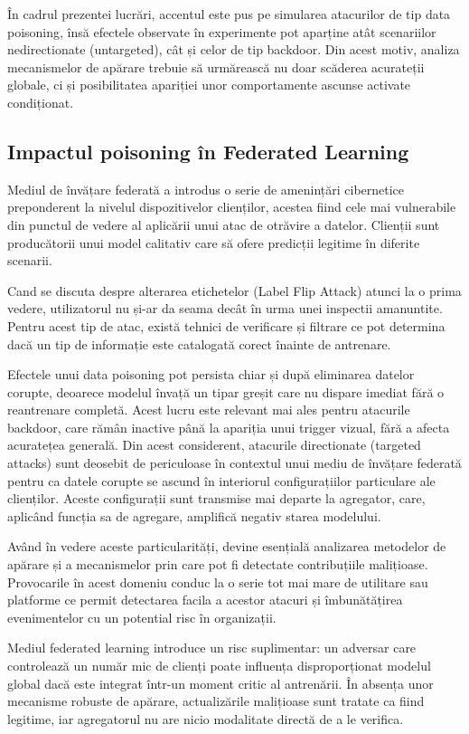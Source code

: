 \documentclass[../../main.tex]{subfiles}
\begin{document}
    În cadrul prezentei lucrări, accentul este pus pe simularea atacurilor de tip data poisoning, însă efectele observate în experimente pot aparține atât scenariilor nedirectionate (untargeted), cât și celor de tip backdoor. Din acest motiv, analiza mecanismelor de apărare trebuie să urmărească nu doar scăderea acurateții globale, ci și posibilitatea apariției unor comportamente ascunse activate condiționat.

    \subsection{Impactul poisoning în Federated Learning}


Mediul de învățare federată a introdus o serie de amenințări cibernetice preponderent la nivelul dispozitivelor clienților, acestea fiind cele mai vulnerabile din punctul de vedere
al aplicării unui atac de otrăvire a datelor. Clienții sunt producătorii unui model calitativ care să ofere predicții legitime în diferite scenarii.

Cand se discuta despre alterarea etichetelor (Label Flip Attack) atunci la o prima vedere, utilizatorul nu și-ar da seama decât în urma unei inspectii amanuntite.
Pentru acest tip de atac, există tehnici de verificare și filtrare ce pot determina dacă un tip de informație este catalogată corect înainte de antrenare.

Efectele unui data poisoning pot persista chiar și după eliminarea datelor corupte, deoarece modelul învață un tipar greșit care nu dispare imediat fără o reantrenare completă.
Acest lucru este relevant mai ales pentru atacurile backdoor, care rămân inactive până la apariția unui trigger vizual, fără a afecta acuratețea generală.
Din acest considerent, atacurile directionate (targeted attacks) sunt deosebit de periculoase în contextul unui mediu de învățare federată pentru ca datele corupte se ascund în
interiorul configurațiilor particulare ale clienților. Aceste configurații sunt transmise mai departe la agregator, care, aplicând funcția sa de agregare, amplifică negativ starea modelului.

Având în vedere aceste particularități, devine esențială analizarea metodelor de apărare și a mecanismelor prin care pot fi detectate contribuțiile malițioase.
Provocarile în acest domeniu conduc la o serie tot mai mare de utilitare sau platforme ce permit detectarea facila a acestor atacuri și îmbunătățirea evenimentelor cu un
potential risc în organizații.

Mediul federated learning introduce un risc suplimentar: un adversar care controlează un număr mic de clienți poate influența disproporționat modelul global dacă este integrat într-un moment critic al antrenării.
În absența unor mecanisme robuste de apărare, actualizările malițioase sunt tratate ca fiind legitime, iar agregatorul nu are nicio modalitate directă de a le verifica.
\end{document}
